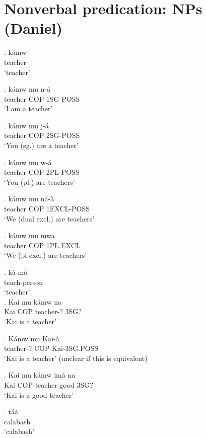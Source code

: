 \documentclass{assets/fieldnotes}
\begin{document}
{\section{Nonverbal predication: NPs (Daniel)}
\exg. kámw\\
teacher\\
`teacher'

\exg. kámw mu n-á\\
teacher COP 1SG-POSS\\
`I am a teacher'

\exg. kámw mu j-á\\
teacher COP 2SG-POSS\\
`You (sg.) are a teacher'

\exg. kámw mu w-á\\
teacher COP 2PL-POSS\\
`You (pl.) are teachers'

\exg. kámw mu ná-à\\
teacher COP 1EXCL-POSS\\
`We (dual excl.) are teachers'

\exg. kámw mu mwa\\
teacher COP 1PL.EXCL\\
`We (pl excl.) are teachers'


\exg. kà-mó\\
teach-person\\
`teacher’\\

\exg. Kai mu kámw na\\
Kai COP teacher-? 3SG?\\
`Kai is a teacher'
\\

\exg. Kámw mu Kai-à\\
teacher-? COP Kai-3SG.POSS\\
`Kai is a teacher' (unclear if this is equivalent)


\exg. Kai mu kámw \textipa{\textltailn}imá na\\
Kai COP teacher good 3SG?\\
`Kai is a good teacher'

\exg. táá\\
calabash\\
`calabash'

}
\end{document}
